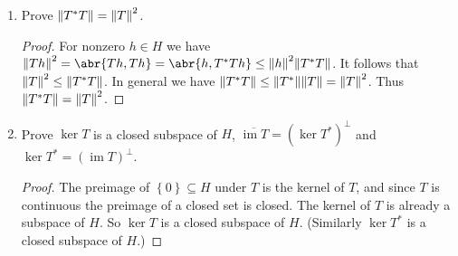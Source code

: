 \documentclass[11pt]{article}
\newcommand{\cbr}[1]{\left\{#1\right\}}
\DeclareMathOperator{\im}{im}
\begin{document}
\begin{enumerate}
\begin{enumerate}
\begin{proof}
        The vector $S^\ast h$ is the unique vector satisfying $\lambda_{S,h}(f) = \abr{Sf,h} = \abr{f,S^\ast h}$ for all $f\in H$. Similarly, the vector $T^\ast h$ is the unique vector satisfying $\lambda_{T,h}(f) = \abr{Tf,h} = \abr{f,T^\ast h}$ for all $f\in H$. Then for all $f\in H$ and $a\in\mathbb{C}$, we have $\abr{(aS+T)f,h} = a\abr{f,S^\ast h} + \abr{f,T^\ast h} = \abr{f,\overline{a}S^\ast h + T^\ast h}$ for all $f\in H$. It follows by uniqueness of the adjoint that $(aS+T)^\ast = \overline{a}S^\ast + T^\ast$ for all $a\in \mathbb{C}$ and $S,T\in B(H)$.

        For all $f,h\in H$ we have $\abr{f,Th} = \overline{\abr{Th,f}} = \overline{\abr{h,T^\ast f}} = \abr{T^\ast f, h} = \abr{f,T^{\ast\ast}h}$. By uniqueness it follows that $T^{\ast\ast} = T$.
      \end{proof}
      \item Prove $\norm{T^\ast T} = \norm{T}^2$. \begin{proof}
        For nonzero $h\in H$ we have $\norm{Th}^2 = \abr{Th,Th} = \abr{h,T^\ast T h}\leq \norm{h}^2\norm{T^\ast T}$. It follows that $\norm{T}^2\leq \norm{T^\ast T}$. In general we have $\norm{T^\ast T}\leq \norm{T^\ast}\norm{T} = \norm{T}^2$. Thus $\norm{T^\ast T} = \norm{T}^2$.
      \end{proof}
      \item Prove $\ker T$ is a closed subspace of $H$, $\overline{\im T} = (\ker T^\ast)^\perp$ and $\ker T^\ast = (\im T)^\perp$. \begin{proof}
        The preimage of $\cbr{0}\subseteq H$ under $T$ is the kernel of $T$, and since $T$ is continuous the preimage of a closed set is closed. The kernel of $T$ is already a subspace of $H$. So $\ker T$ is a closed subspace of $H$. (Similarly $\ker T^\ast$ is a closed subspace of $H$.)


\end{proof}
\end{enumerate}
\end{enumerate}
\end{document}
